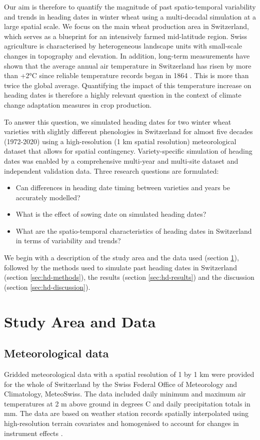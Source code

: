 Our aim is therefore to quantify the magnitude of past spatio-temporal variability and trends in heading dates in winter wheat using a multi-decadal simulation at a large spatial scale. We focus on the main wheat production area in Switzerland, which serves as a blueprint for an intensively farmed mid-latitude region. Swiss agriculture is characterised by heterogeneous landscape units with small-scale changes in topography and elevation. In addition, long-term measurements have shown that the average annual air temperature in Switzerland has risen by more than +2°C since reliable temperature records began in 1864 \citep{isotta_longterm_2019}. This is more than twice the global average. Quantifying the impact of this temperature increase on heading dates is therefore a highly relevant question in the context of climate change adaptation measures in crop production.

To answer this question, we simulated heading dates for two winter wheat varieties with slightly different phenologies in Switzerland for almost five decades (1972-2020) using a high-resolution (1 km spatial resolution) meteorological dataset that allows for spatial contingency. Variety-specific simulation of heading dates was enabled by a comprehensive multi-year and multi-site dataset and independent validation data. Three research questions are formulated:
\begin{itemize}
    \item Can differences in heading date timing between varieties and years be accurately modelled?
    \item What is the effect of sowing date on simulated heading dates?
    \item What are the spatio-temporal characteristics of heading dates in Switzerland in terms of variability and trends?
\end{itemize}
We begin with a description of the study area and the data used (section \ref{sec:hd-data}), followed by the methods used to simulate past heading dates in Switzerland (section \ref{sec:hd-methods}), the results (section \ref{sec:hd-results}) and the discussion (section \ref{sec:hd-discussion}).

\section{Study Area and Data}
\label{sec:hd-data}

\subsection{Meteorological data}
\label{subsec:meteo}
Gridded meteorological data with a spatial resolution of 1 by 1 km were provided for the whole of Switzerland by the Swiss Federal Office of Meteorology and Climatology, MeteoSwiss. The data included daily minimum and maximum air temperatures at 2 m above ground in degrees C and daily precipitation totals in mm. The data are based on weather station records spatially interpolated using high-resolution terrain covariates \citep{frei_interpolation_2014} and homogenised to account for changes in instrument effects \citep{ceppi_revisiting_2012}.

